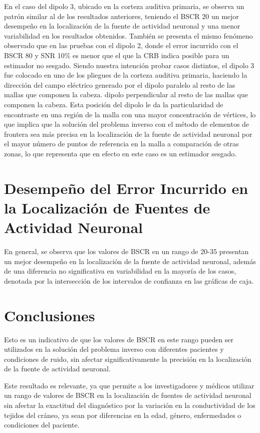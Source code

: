 En el caso del dipolo 3, ubicado en la corteza auditiva primaria, se observa un patrón similar al de los resultados anteriores, teniendo el BSCR 20 un mejor desempeño en la localización de la fuente de actividad neuronal y una menor variabilidad en los resultados obtenidos.
También se presenta el mismo fenómeno observado que en las pruebas con el dipolo 2, donde el error incurrido con el BSCR 80 y SNR 10\% es menor que el que la CRB indica posible para un estimador no sesgado.
Siendo nuestra intención probar casos distintos, el dipolo 3 fue colocado en uno de los pliegues de la corteza auditiva primaria, haciendo la dirección del campo eléctrico generado por el dipolo paralelo al resto de las mallas que componen la cabeza.
dipolo perpendicular al resto de las mallas que componen la cabeza.
Esta posición del dipolo le da la particularidad de encontraste en una región de la malla con una mayor concentración de vértices, lo que implica que la solución del problema inverso con el método de elementos de frontera sea más precisa en la localización de la fuente de actividad neuronal por el mayor número de puntos de referencia en la malla a comparación de otras zonas, lo que representa que en efecto en este caso es un estimador sesgado. 

\section{Desempeño del Error Incurrido en la Localización de Fuentes de Actividad Neuronal}

En general, se observa que los valores de BSCR en un rango de 20-35 presentan un mejor desempeño en la localización de la fuente de actividad neuronal, además de una diferencia no significativa en variabilidad en la mayoría de los casos, denotada por la intersección de los intervalos de confianza en las gráficas de caja.

\section{Conclusiones}


Esto es un indicativo de que los valores de BSCR en este rango pueden ser utilizados en la solución del problema inverso con diferentes pacientes y condiciones de ruido, sin afectar significativamente la precisión en la localización de la fuente de actividad neuronal.

Este resultado es relevante, ya que permite a los investigadores y médicos utilizar un rango de valores de BSCR en la localización de fuentes de actividad neuronal sin afectar la exactitud del diagnóstico por la variación en la conductividad de los tejidos del cráneo, ya sean por diferencias en la edad, género, enfermedades o condiciones del paciente.